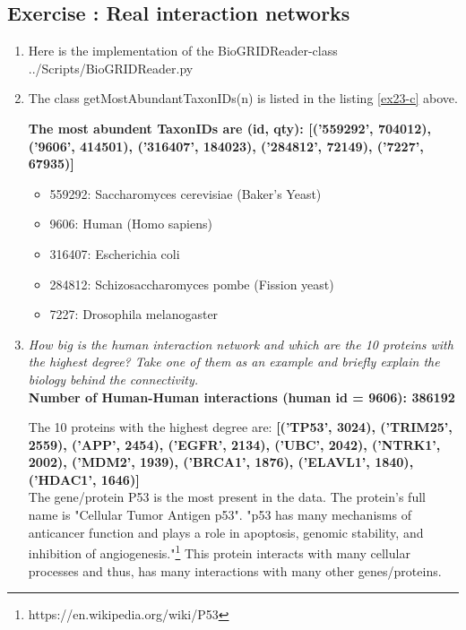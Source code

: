 \documentclass[10pt,a4paper]{article}
\newcommand{\exercise}[1]
{
  \stepcounter{subsection}
  \subsection*{Exercise \thesubsection: #1}

}
\begin{document}
\newpage
\exercise{Real interaction networks}
\begin{enumerate}
	\item Here is the implementation of the BioGRIDReader-class
	 {../Scripts/BioGRIDReader.py}
	
	
	
	
	\item The class getMostAbundantTaxonIDs(n) is listed in the listing \ref{ex23-c} above. 
	
	\textbf{The most abundent TaxonIDs are (id, qty):  [('559292', 704012), ('9606', 414501), ('316407', 184023), ('284812', 72149), ('7227', 67935)]}
	
	\begin{itemize}
		\item 559292: Saccharomyces cerevisiae (Baker's Yeast)
		\item   9606: Human (Homo sapiens) 
		\item 316407: Escherichia coli
		\item 284812: Schizosaccharomyces pombe (Fission yeast)
		\item   7227: Drosophila melanogaster
	\end{itemize}
	
	
	
	
	
	\item \textit{How big is the human interaction network and which are the 10 proteins with the highest
		degree? Take one of them as an example and briefly explain the biology behind the
		connectivity.}\\
	
	
	
	
	\textbf{Number of Human-Human interactions (human id = 9606):  386192}
	
	The  10  proteins with the highest degree are: 
	\textbf{[('TP53', 3024), ('TRIM25', 2559), ('APP', 2454), ('EGFR', 2134), ('UBC', 2042), ('NTRK1', 2002), ('MDM2', 1939), ('BRCA1', 1876), ('ELAVL1', 1840), ('HDAC1', 1646)]}\\
	
	
	The gene/protein P53 is the most present in the data. The protein's full name is "Cellular Tumor Antigen p53". "p53 has many mechanisms of anticancer function and plays a role in apoptosis, genomic stability, and inhibition of angiogenesis."\footnote{https://en.wikipedia.org/wiki/P53} This protein interacts with many cellular processes and thus, has many interactions with many other genes/proteins. 
	

\end{enumerate}
\end{document}
